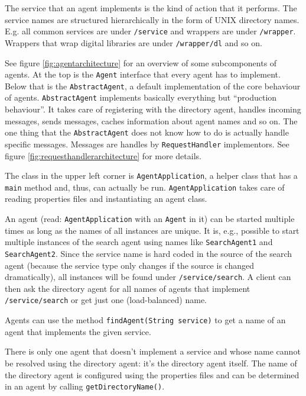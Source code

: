 \documentclass[12pt]{book}
\begin{document}
The service that an agent implements is the kind of action that it performs. The service names are structured hierarchically in the form of UNIX directory names. E.g. all common services are under {\tt /service} and wrappers are under {\tt /wrapper}. Wrappers that wrap digital libraries are under {\tt /wrapper/dl} and so on.

See figure \ref{fig:agentarchitecture} for an overview of some subcomponents of agents. At the top is the {\tt Agent} interface that every agent has to implement. Below that is the {\tt AbstractAgent}, a default implementation of the core behaviour of agents. {\tt AbstractAgent} implements basically everything but ``production behaviour''. It takes care of registering with the directory agent, handles incoming messages, sends messages, caches information about agent names and so on. The one thing that the {\tt AbstractAgent} does not know how to do is actually handle specific messages. Messages are handles by {\tt RequestHandler} implementors. See figure \ref{fig:requesthandlerarchitecture} for more details.

The class in the upper left corner is {\tt AgentApplication}, a helper class that has a {\tt main} method and, thus, can actually be run. {\tt AgentApplication} takes care of reading properties files and instantiating an agent class.

An agent (read: {\tt AgentApplication} with an {\tt Agent} in it) can be started multiple times as long as the names of all instances are unique. It is, e.g., possible to start multiple instances of the search agent using names like {\tt SearchAgent1} and {\tt SearchAgent2}. Since the service name is hard coded in the source of the search agent (because the service type only changes if the source is changed dramatically), all instances will be found under {\tt /service/search}. A client can then ask the directory agent for all names of agents that implement {\tt /service/search} or get just one (load-balanced) name.

Agents can use the method {\tt findAgent(String service)} to get a name of an agent that implements the given service.

There is only one agent that doesn't implement a service and whose name cannot be resolved using the directory agent: it's the directory agent itself. The name of the directory agent is configured using the properties files and can be determined in an agent by calling {\tt getDirectoryName()}.
\end{document}
